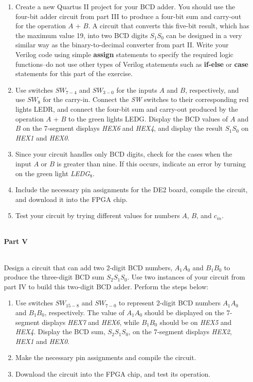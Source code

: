 \documentclass[psfig,10pt,fullpage]{article}
\begin{document}
\begin{enumerate}
\item Create a new Quartus II project for your BCD adder. You should use the
four-bit adder circuit from part III to produce a four-bit sum and carry-out for the
operation $A$ + $B$. A circuit that converts this five-bit result, which has the maximum
value 19, into two BCD digits $S_1 S_0$ can be designed in a very
similar way as the binary-to-decimal converter from part II. Write your Verilog code using
simple {\bf assign} statements to specify the required logic functions--do not use 
other types of Verilog
statements such as {\bf if-else} or {\bf case} statements for this part of the exercise.
\item Use switches $SW_{7-4}$ and $SW_{3-0}$ for the inputs $A$ and $B$, respectively, and
use $SW_{8}$ for the carry-in. Connect the {\it SW} switches to
their corresponding red lights LEDR, and connect the four-bit sum and carry-out produced 
by the operation $A$ + $B$ to the green lights LEDG. Display the BCD values of $A$
and $B$ on the 7-segment displays {\it HEX6} and {\it HEX4}, and display the result $S_1 S_0$ on
{\it HEX1} and {\it HEX0}.
\item Since your circuit handles only BCD digits, check for the cases when the input 
$A$ or $B$ is greater than nine. If this occurs, indicate an error by turning on 
the green light {\it LEDG}$_8$.
\item Include the necessary pin assignments for the DE2 board, compile the circuit, and
download it into the FPGA chip.
\item Test your circuit by trying different values for numbers $A$, $B$, and $c_{in}$.
\end{enumerate}

~\\
\noindent
{\bf Part V}

~\\
\noindent
Design a circuit that can add two 2-digit BCD numbers, $A_1 A_0$ and $B_1 B_0$ to produce
the three-digit BCD sum $S_2 S_1 S_0$. Use two instances of your circuit
from part IV to build this two-digit BCD adder. Perform the steps below:
\begin{enumerate}
\item Use switches $SW_{15-8}$ and $SW_{7-0}$ to represent 2-digit 
BCD numbers $A_1 A_0$ and $B_1 B_0$, respectively.
The value of $A_1 A_0$ should be displayed on the 7-segment displays {\it HEX7} 
and {\it HEX6}, while $B_1 B_0$ should be on {\it HEX5} and {\it HEX4}.
Display the BCD sum, $S_2 S_1 S_0$, on the 7-segment displays {\it HEX2},
{\it HEX1} and {\it HEX0}.
\item Make the necessary pin assignments and compile the circuit.
\item Download the circuit into the FPGA chip, and test its operation.
\end{enumerate}
\end{document}
